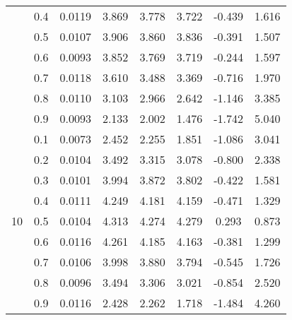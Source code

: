 \documentclass[11pt,a4paper]{report}
\begin{document}
\begin{longtable}{ | c | c || c | c | c | c | c | c | }
 & 0.4 & 0.0119 & 3.869 & 3.778 & 3.722 & -0.439 & 1.616 \\
 & 0.5 & 0.0107 & 3.906 & 3.860 & 3.836 & -0.391 & 1.507 \\
 & 0.6 & 0.0093 & 3.852 & 3.769 & 3.719 & -0.244 & 1.597 \\
 & 0.7 & 0.0118 & 3.610 & 3.488 & 3.369 & -0.716 & 1.970 \\
 & 0.8 & 0.0110 & 3.103 & 2.966 & 2.642 & -1.146 & 3.385 \\
 & 0.9 & 0.0093 & 2.133 & 2.002 & 1.476 & -1.742 & 5.040 \\
 \hline
\multirow{9}{*}{10} & 0.1 & 0.0073 & 2.452 & 2.255 & 1.851 & -1.086 & 3.041 \\
 & 0.2 & 0.0104 & 3.492 & 3.315 & 3.078 & -0.800 & 2.338 \\
 & 0.3 & 0.0101 & 3.994 & 3.872 & 3.802 & -0.422 & 1.581 \\
 & 0.4 & 0.0111 & 4.249 & 4.181 & 4.159 & -0.471 & 1.329 \\
 & 0.5 & 0.0104 & 4.313 & 4.274 & 4.279 & 0.293 & 0.873 \\
 & 0.6 & 0.0116 & 4.261 & 4.185 & 4.163 & -0.381 & 1.299 \\
 & 0.7 & 0.0106 & 3.998 & 3.880 & 3.794 & -0.545 & 1.726 \\
 & 0.8 & 0.0096 & 3.494 & 3.306 & 3.021 & -0.854 & 2.520 \\
 & 0.9 & 0.0116 & 2.428 & 2.262 & 1.718 & -1.484 & 4.260 \\
 \hline
\hline
\end{longtable}
\end{document}
